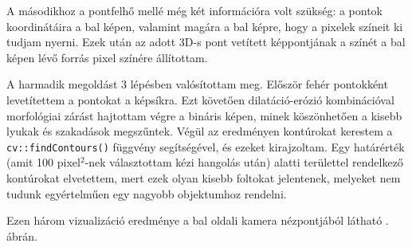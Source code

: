 A másodikhoz a pontfelhő mellé még két információra volt szükség: a pontok koordinátáira a bal képen, valamint magára a bal képre, hogy a pixelek színeit ki tudjam nyerni. Ezek után az adott 3D-s pont vetített képpontjának a színét a bal képen lévő forrás pixel színére állítottam.

A harmadik megoldást 3 lépésben valósítottam meg. Először fehér pontokként levetítettem a pontokat a képsíkra. Ezt követően dilatáció-erózió kombinációval morfológiai zárást hajtottam végre a bináris képen, minek köszönhetően a kisebb lyukak és szakadások megszűntek. Végül az eredményen kontúrokat kerestem a \texttt{cv::findContours()} függvény segítségével, és ezeket kirajzoltam. Egy határérték (amit 100 pixel$^2$-nek választottam kézi hangolás után) alatti területtel rendelkező kontúrokat elvetettem, mert ezek olyan kisebb foltokat jelentenek, melyeket nem tudunk egyértelműen egy nagyobb objektumhoz rendelni.

Ezen három vizualizáció eredménye a bal oldali kamera nézpontjából látható . ábrán.

